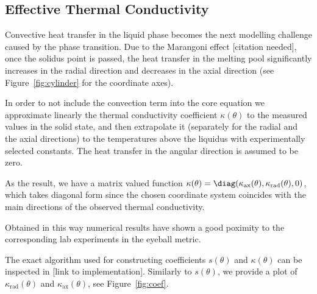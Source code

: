 \subsection{Effective Thermal Conductivity}
\label{subsec:conductivity}

Convective heat transfer in the liquid phase becomes the next modelling challenge caused by the phase transition. Due to the Marangoni effect [citation needed], once the solidus point is passed, the heat transfer in the melting pool significantly increases in the radial direction and decreases in the axial direction (see Figure~\ref{fig:cylinder} for the coordinate axes).

In order to not include the convection term into the core equation we approximate linearly the thermal conductivity coefficient $\kappa(\theta)$ to the measured values in the solid state, and then extrapolate it (separately for the radial and the axial directions) to the temperatures above the liquidus with experimentally selected constants. The heat transfer in the angular direction is assumed to be zero.

As the result, we have a matrix valued function $\kappa(\theta) = \diag(\kappa_\text{ax}(\theta), \kappa_\text{rad}(\theta), 0)$, which takes diagonal form since the chosen coordinate system coincides with the main directions of the observed thermal conductivity.



{\color{TolHighContrastBlue}
Obtained in this way numerical results have shown a good poximity to the corresponding lab experiments in the eyeball metric.
}

The exact algorithm used for constructing coefficients $s(\theta)$ and $\kappa(\theta)$ can be inspected in [link to implementation]. Similarly to $s(\theta)$, we provide a plot of $\kappa_\text{rad}(\theta)$ and $\kappa_\text{ax}(\theta)$, see Figure~\ref{fig:coef}.

